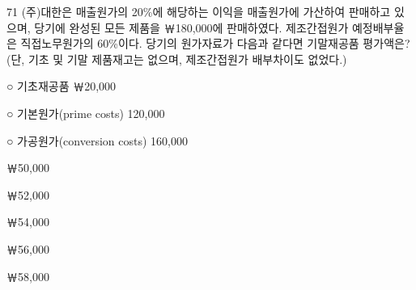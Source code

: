 \begin{question}{71}
(주)대한은 매출원가의 20\%에 해당하는 이익을 매출원가에 가산하여 판매하고 있으며, 당기에 완성된 모든 제품을 ￦180,000에 판매하였다. 제조간접원가 예정배부율은 직접노무원가의 60\%이다. 당기의 원가자료가 다음과 같다면 기말재공품 평가액은? (단, 기초 및 기말 제품재고는 없으며, 제조간접원가 배부차이도 없었다.)
\begin{framedtext}
○ 기초재공품 ￦20,000 \par
○ 기본원가(prime costs) 120,000 \par
○ 가공원가(conversion costs) 160,000 \par
\end{framedtext}
\begin{choices}
  \item ￦50,000
  \item ￦52,000
  \item ￦54,000
  \item ￦56,000
  \item ￦58,000
\end{choices}
\end{question}
